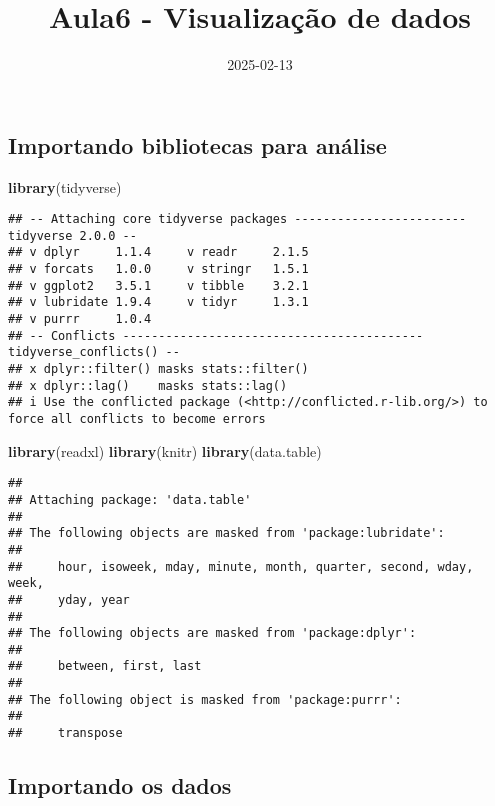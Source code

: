 \documentclass[
]{article}
\title{Aula6 - Visualização de dados}
\author{}
\date{\vspace{-2.5em}2025-02-13}
\newenvironment{Shaded}{\begin{snugshade}}{\end{snugshade}}
\newcommand{\FunctionTok}[1]{\textcolor[rgb]{0.13,0.29,0.53}{\textbf{#1}}}
\newcommand{\NormalTok}[1]{#1}
\begin{document}
\maketitle

\subsection{Importando bibliotecas para
análise}\label{importando-bibliotecas-para-anuxe1lise}

\begin{Shaded}
\begin{Highlighting}[]
\FunctionTok{library}\NormalTok{(tidyverse)}
\end{Highlighting}
\end{Shaded}

\begin{verbatim}
## -- Attaching core tidyverse packages ------------------------ tidyverse 2.0.0 --
## v dplyr     1.1.4     v readr     2.1.5
## v forcats   1.0.0     v stringr   1.5.1
## v ggplot2   3.5.1     v tibble    3.2.1
## v lubridate 1.9.4     v tidyr     1.3.1
## v purrr     1.0.4     
## -- Conflicts ------------------------------------------ tidyverse_conflicts() --
## x dplyr::filter() masks stats::filter()
## x dplyr::lag()    masks stats::lag()
## i Use the conflicted package (<http://conflicted.r-lib.org/>) to force all conflicts to become errors
\end{verbatim}

\begin{Shaded}
\begin{Highlighting}[]
\FunctionTok{library}\NormalTok{(readxl)}
\FunctionTok{library}\NormalTok{(knitr)}
\FunctionTok{library}\NormalTok{(data.table)}
\end{Highlighting}
\end{Shaded}

\begin{verbatim}
## 
## Attaching package: 'data.table'
## 
## The following objects are masked from 'package:lubridate':
## 
##     hour, isoweek, mday, minute, month, quarter, second, wday, week,
##     yday, year
## 
## The following objects are masked from 'package:dplyr':
## 
##     between, first, last
## 
## The following object is masked from 'package:purrr':
## 
##     transpose
\end{verbatim}

\subsection{Importando os dados}\label{importando-os-dados}
\end{document}
